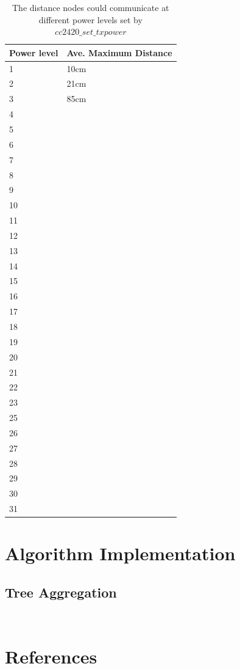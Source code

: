 \documentclass[a4paper,notitlepage]{article}
\begin{document}
\begin{table}[H]
	\centering
	\begin{tabular}{ | l | l | }
		\hline
		Power level & Ave. Maximum Distance \\
		\hline
		1 & 10cm \\
		2 & 21cm \\
		3 & 85cm \\
		4 & ~ \\
		5 & ~ \\
		6 & ~ \\
		7 & ~ \\
		8 & ~ \\
		9 & ~ \\
		10 & ~ \\
		11 & ~ \\
		12 & ~ \\
		13 & ~ \\
		14 & ~ \\
		15 & ~ \\
		16 & ~ \\
		17 & ~ \\
		18 & ~ \\
		19 & ~ \\
		20 & ~ \\
		21 & ~ \\
		22 & ~ \\
		23 & ~ \\
		25 & ~ \\
		26 & ~ \\
		27 & ~ \\
		28 & ~ \\
		29 & ~ \\
		30 & ~ \\
		31 & ~ \\
		\hline
	\end{tabular}
	\caption{The distance nodes could communicate at different power levels set by $cc2420\_set\_txpower$}
\end{table}

\newpage

\section{Algorithm Implementation}

\subsection{Tree Aggregation}

\inputminted[linenos=true,tabsize=3,fontsize=\small,frame=lines,framesep=2mm]{c}{../Algorithms/Common/net/tree-aggregator.h}
\inputminted[linenos=true,tabsize=3,fontsize=\small,frame=lines,framesep=2mm]{c}{../Algorithms/Common/net/tree-aggregator.c}



\newpage


\section{References}
\renewcommand{\refname}{\vspace{-1cm}}


\end{document}
